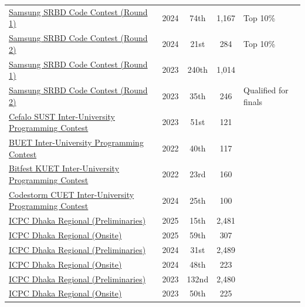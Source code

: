 \documentclass[10pt]{article}
\begin{document}
{\begin{longtable}{@{}p{7.6cm} c c c l@{}}
\href{https://www.hackerrank.com/contests/srbd-code-contest-2024-round-1/leaderboard}{Samsung SRBD Code Contest (Round 1)} & 2024 & 74th & 1{,}167 & Top 10\% \\
\href{https://www.hackerrank.com/contests/srbd-code-contest-2024-round-2/leaderboard}{Samsung SRBD Code Contest (Round 2)} & 2024 & 21st & 284 & Top 10\% \\
\href{https://www.hackerrank.com/contests/srbd-code-contest-2023-round-1/leaderboard}{Samsung SRBD Code Contest (Round 1)} & 2023 & 240th & 1{,}014 &  \\
\href{https://www.hackerrank.com/contests/srbd-code-contest-2023-round-2/leaderboard}{Samsung SRBD Code Contest (Round 2)} & 2023 & 35th & 246 & Qualified for finals \\
\href{https://toph.co/c/sust-inter-university-2023/standings}{Cefalo SUST Inter-University Programming Contest} & 2023 & 51st & 121 & \\
\href{https://toph.co/c/buet-inter-university-2022/standings}{BUET Inter-University Programming Contest} & 2022 & 40th & 117 & \\
\href{https://bapsoj.org/contests/miaki-presents-kuet-iupc-onsite-2025/standings}{Bitfest KUET Inter-University Programming Contest} & 2022 & 23rd & 160 & \\
\href{https://toph.co/c/cuet-inter-university-codestorm-1-0/standings}{Codestorm CUET Inter-University Programming Contest} & 2024 & 25th & 100 & \\
\href{https://icpc.global/regionals/finder/Dhaka-Preliminary-2024/standings}{ICPC Dhaka Regional (Preliminaries)} & 2025 & 15th & 2{,}481 & \\
\href{https://icpc.global/regionals/finder/Dhaka-2025/standings}{ICPC Dhaka Regional (Onsite)} & 2025 & 59th & 307 & \\
\href{https://bapsoj.org/contests/icpc-preliminary-dhaka-site-2024/standings}{ICPC Dhaka Regional (Preliminaries)} & 2024 & 31st & 2{,}489 & \\
\href{https://icpc.global/regionals/finder/Dhaka-2024/standings}{ICPC Dhaka Regional (Onsite)} & 2024 & 48th & 223 & \\
\href{https://bapsoj.org/contests/icpc-preliminary-dhaka-site-2024/standings}{ICPC Dhaka Regional (Preliminaries)} & 2023 & 132nd & 2{,}480 & \\
\href{https://bapsoj.org/contests/icpc-dhaka-regional-site-2023/standings}{ICPC Dhaka Regional (Onsite)} & 2023 & 50th & 225 & \\
\bottomrule
\end{longtable}
}
\end{document}
